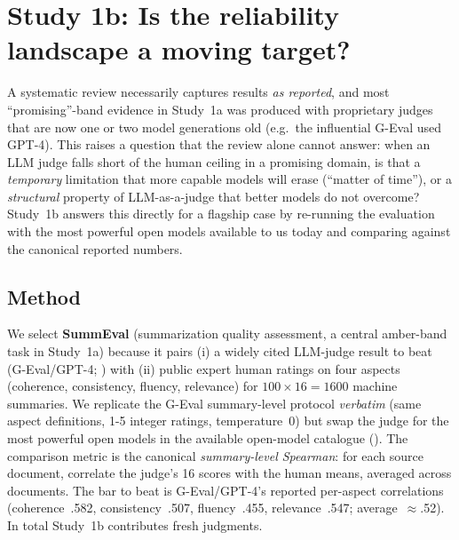 \section{Study 1b: Is the reliability landscape a moving target?}\label{sec:s1b}
A systematic review necessarily captures results \emph{as reported}, and most ``promising''-band evidence in
Study~1a was produced with proprietary judges that are now one or two model generations old (e.g.\ the influential
G-Eval used GPT-4). This raises a question that the review alone cannot answer: when an LLM judge falls short of the
human ceiling in a promising domain, is that a \emph{temporary} limitation that more capable models will erase
(``matter of time''), or a \emph{structural} property of LLM-as-a-judge that better models do not overcome? Study~1b
answers this directly for a flagship case by re-running the evaluation with the most powerful open models available
to us today and comparing against the canonical reported numbers.

\subsection{Method}
We select \textbf{SummEval} \citep{fabbri2021summeval} (summarization quality assessment, a central amber-band task
in Study~1a) because it pairs (i) a widely cited LLM-judge result to beat (G-Eval/GPT-4; \citealp{liu2023geval})
with (ii) public expert human ratings on four aspects (coherence, consistency, fluency, relevance) for
$100\times16=1600$ machine summaries. We replicate the G-Eval summary-level protocol \emph{verbatim} (same aspect
definitions, 1-5 integer ratings, temperature~0) but swap the judge for the \ONEmodels{} most powerful open models
in the available open-model catalogue (\ONEpanel). The comparison metric is the canonical \emph{summary-level Spearman}: for each
source document, correlate the judge's 16 scores with the human means, averaged across documents. The bar to beat is
G-Eval/GPT-4's reported per-aspect correlations (coherence~.582, consistency~.507, fluency~.455, relevance~.547;
average~$\approx$.52). In total Study~1b contributes \ONEnjudg{} fresh judgments.

